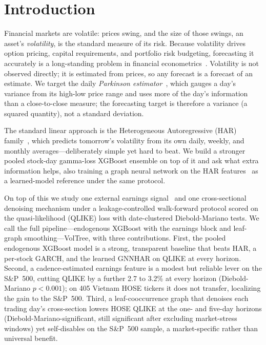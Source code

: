 \documentclass[runningheads,a4paper]{llncs}
\begin{document}
\section{Introduction}
Financial markets are volatile: prices swing, and the size of those swings, an asset's
\emph{volatility}, is the standard measure of its risk. Because volatility drives option
pricing, capital requirements, and portfolio risk budgeting, forecasting
it accurately is a long-standing problem in financial econometrics~\cite{corsi2009}. Volatility is
not observed directly; it is estimated from prices, so any forecast is a forecast of an estimate. We
target the daily \emph{Parkinson estimator}~\cite{parkinson1980}, which gauges a day's variance from
its high-low price range and uses more of the day's information than a close-to-close measure; the
forecasting target is therefore a variance (a squared quantity), not a standard deviation.

The standard linear approach is the Heterogeneous Autoregressive (HAR) family~\cite{corsi2009}, which predicts
tomorrow's volatility from its own daily, weekly, and monthly averages---deliberately simple yet hard to
beat. We build a stronger pooled stock-day gamma-loss XGBoost ensemble on top of it and ask what extra
information helps, also training a graph neural network on the HAR features~\cite{gnnhar2024} as a
learned-model reference under the same protocol.

On top of this we study one external earnings signal~\cite{patell1981} and one cross-sectional denoising
mechanism under a leakage-controlled walk-forward protocol scored on the quasi-likelihood (QLIKE) loss with date-clustered
Diebold-Mariano tests. We call the full pipeline---endogenous XGBoost with the earnings block and
leaf-graph smoothing---VolTree, with three contributions. First, the pooled endogenous XGBoost
model is a strong, transparent baseline that beats HAR, a per-stock GARCH, and the learned GNNHAR on QLIKE
at every horizon. Second, a cadence-estimated earnings feature is a modest but reliable lever on the
S\&P~500, cutting QLIKE by a further 2.7 to 3.2\% at every horizon (Diebold-Mariano $p<0.001$); on 405
Vietnam HOSE tickers it does not transfer, localizing the gain to the S\&P~500. Third, a leaf-cooccurrence
graph that denoises each trading day's cross-section lowers HOSE QLIKE at the one- and five-day horizons
(Diebold-Mariano-significant, still significant after excluding market-stress windows) yet self-disables on
the S\&P~500 sample, a market-specific rather than universal benefit.
\end{document}
